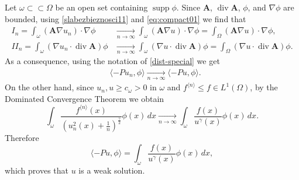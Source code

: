 \documentclass[12pt,a4paper]{amsart}
\theoremstyle{definition}
\newcommand{\supp}{\operatorname{supp }}
\newcommand{\A}{\mathbf{A}}
\newcommand*\Div{\operatorname{div}}
\begin{document}
Let $\omega\subset\subset\Omega$ be an open set containing $\supp \phi$. Since $\A$, $\Div \A$, $\phi$, and $\nabla \phi$ are bounded, using \eqref{slabezbieznosci11} and \eqref{eq:compact01} we find that
\begin{align*}
\textit{I}_n = \int_\omega (\A \nabla u_n)\cdot \nabla \phi &\mathop{\longrightarrow}\limits_{n\to\infty} \int_\omega   (\A \nabla u) \cdot \nabla \phi= \int_\Omega  (\A \nabla u)\cdot \nabla \phi, \\
\textit{II}_n = \int_\omega (\nabla u_n\cdot \Div \A) \phi &\mathop{\longrightarrow}\limits_{n\to\infty} \int_\omega (\nabla u\cdot \Div \A) \phi = \int_\Omega (\nabla u\cdot \Div \A) \phi.
\end{align*}
As a consequence, using the notation of \eqref{dist-special} we get
\begin{align*}
&\langle -Pu_n, \phi \rangle \mathop{\longrightarrow}\limits_{n\to\infty} \langle -Pu, \phi \rangle. 
\end{align*}
On the other hand, since $u_n,u\geq c_\omega>0$ in $\omega$ and $f^{{\langle n \rangle}}\leq f\in L^1(\Omega)$, by the Dominated Convergence Theorem we obtain
$$
\int_\omega  \frac{f^{{\langle n \rangle}}(x)}{\left(u_n^2(x) +\frac{1}{n}\right)^{\frac{\gamma}{2}}} \phi(x)\, dx \mathop{\longrightarrow}\limits_{n\to\infty} \int_\omega  \frac{f(x)}{u^\gamma(x)} \phi(x)\, dx. 
$$
Therefore
$$
\langle -Pu, \phi \rangle = \int_\omega  \frac{f(x)}{u^\gamma(x)} \phi(x)\, dx,$$
which proves that $u$ is a weak solution.
\end{document}
